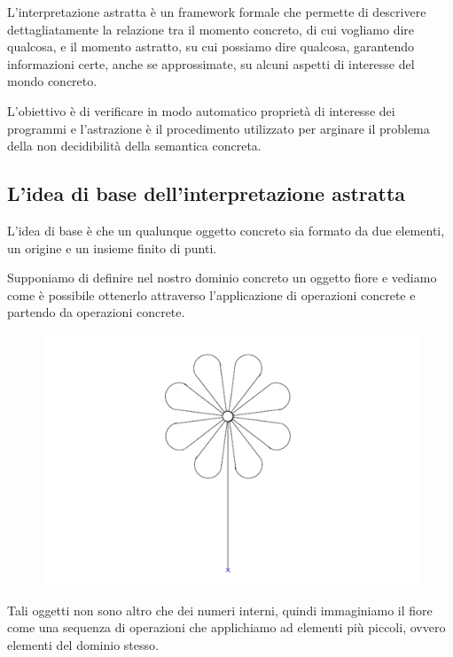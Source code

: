\begin{tcolorbox}[title=Interpretazione astratta]
    L'interpretazione astratta è un framework formale che permette di descrivere 
    dettagliatamente la relazione tra il momento concreto, di cui vogliamo dire 
    qualcosa, e il momento astratto, su cui possiamo dire qualcosa, garantendo informazioni 
    certe, anche se approssimate, su alcuni aspetti di interesse
    del mondo concreto.
\end{tcolorbox}
L'obiettivo è di verificare in modo automatico proprietà di interesse dei programmi e 
l'astrazione è il procedimento utilizzato per arginare il problema della non decidibilità
della semantica concreta.

\subsection{L'idea di base dell'interpretazione astratta}
L'idea di base è che un qualunque oggetto concreto sia formato da due elementi, un origine e 
un insieme finito di punti.

Supponiamo di definire nel nostro dominio concreto un oggetto fiore e vediamo come è possibile 
ottenerlo attraverso l'applicazione di operazioni concrete e partendo da operazioni concrete.
\begin{figure}[H]
    \centering 
    \includegraphics[scale=0.5]{img/flower.png}
\end{figure}
Tali oggetti non sono altro che dei numeri interni, quindi immaginiamo il fiore come una sequenza 
di operazioni che applichiamo ad elementi più piccoli, ovvero elementi del dominio stesso.
